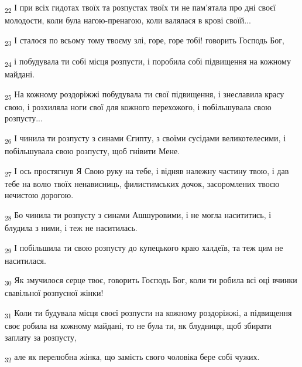 \begin{tcolorbox}
\textsubscript{22} І при всіх гидотах твоїх та розпустах твоїх ти не пам'ятала про дні своєї молодости, коли була нагою-пренагою, коли валялася в крові своїй...
\end{tcolorbox}
\begin{tcolorbox}
\textsubscript{23} І сталося по всьому тому твоєму злі, горе, горе тобі! говорить Господь Бог,
\end{tcolorbox}
\begin{tcolorbox}
\textsubscript{24} і побудувала ти собі місця розпусти, і поробила собі підвищення на кожному майдані.
\end{tcolorbox}
\begin{tcolorbox}
\textsubscript{25} На кожному роздоріжжі побудувала ти свої підвищення, і знеславила красу свою, і розхиляла ноги свої для кожного перехожого, і побільшувала свою розпусту...
\end{tcolorbox}
\begin{tcolorbox}
\textsubscript{26} І чинила ти розпусту з синами Єгипту, з своїми сусідами великотелесими, і побільшувала свою розпусту, щоб гнівити Мене.
\end{tcolorbox}
\begin{tcolorbox}
\textsubscript{27} І ось простягнув Я Свою руку на тебе, і відняв належну частину твою, і дав тебе на волю твоїх ненависниць, филистимських дочок, засоромлених твоєю нечистою дорогою.
\end{tcolorbox}
\begin{tcolorbox}
\textsubscript{28} Бо чинила ти розпусту з синами Ашшуровими, і не могла насититись, і блудила з ними, і теж не наситилась.
\end{tcolorbox}
\begin{tcolorbox}
\textsubscript{29} І побільшила ти свою розпусту до купецького краю халдеїв, та теж цим не наситилася.
\end{tcolorbox}
\begin{tcolorbox}
\textsubscript{30} Як змучилося серце твоє, говорить Господь Бог, коли ти робила всі оці вчинки свавільної розпусної жінки!
\end{tcolorbox}
\begin{tcolorbox}
\textsubscript{31} Коли ти будувала місця своєї розпусти на кожному роздоріжжі, а підвищення своє робила на кожному майдані, то не була ти, як блудниця, щоб збирати заплату за розпусту,
\end{tcolorbox}
\begin{tcolorbox}
\textsubscript{32} але як перелюбна жінка, що замість свого чоловіка бере собі чужих.
\end{tcolorbox}
